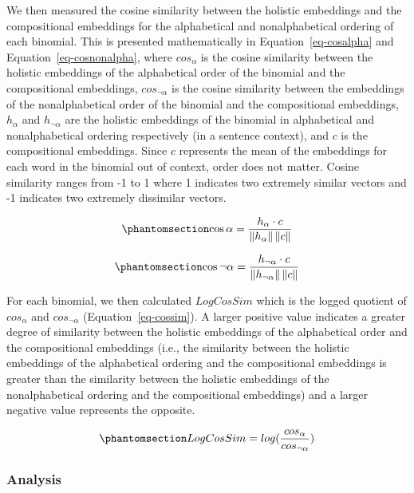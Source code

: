 \documentclass[
  12pt,
  letterpaper,
]{scrreprt}
\begin{document}
We then measured the cosine similarity between the holistic embeddings
and the compositional embeddings for the alphabetical and
nonalphabetical ordering of each binomial. This is presented
mathematically in Equation~\ref{eq-cosalpha} and
Equation~\ref{eq-cosnonalpha}, where \(cos_\alpha\) is the cosine
similarity between the holistic embeddings of the alphabetical order of
the binomial and the compositional embeddings, \(cos_{\neg\alpha}\) is
the cosine similarity between the embeddings of the nonalphabetical
order of the binomial and the compositional embeddings, \(h_\alpha\) and
\(h_{\neg\alpha}\) are the holistic embeddings of the binomial in
alphabetical and nonalphabetical ordering respectively (in a sentence
context), and \(c\) is the compositional embeddings. Since \(c\)
represents the mean of the embeddings for each word in the binomial out
of context, order does not matter. Cosine similarity ranges from -1 to 1
where 1 indicates two extremely similar vectors and -1 indicates two
extremely dissimilar vectors.

\begin{equation}\phantomsection\label{eq-cosalpha}{
\cos \alpha = \frac{h_\alpha \cdot c}{\left\lVert h_\alpha \right\rVert \left\lVert c \right\rVert}
}\end{equation}

\begin{equation}\phantomsection\label{eq-cosnonalpha}{
\cos \neg\alpha = \frac{h_{\neg\alpha} \cdot c}{\left\lVert h_{\neg\alpha}\right\rVert \left\lVert c \right\rVert}
}\end{equation}

For each binomial, we then calculated \(LogCosSim\) which is the logged
quotient of \(cos_\alpha\) and \(cos_{\neg\alpha}\)
(Equation~\ref{eq-cossim}). A larger positive value indicates a greater
degree of similarity between the holistic embeddings of the alphabetical
order and the compositional embeddings (i.e., the similarity between the
holistic embeddings of the alphabetical ordering and the compositional
embeddings is greater than the similarity between the holistic
embeddings of the nonalphabetical ordering and the compositional
embeddings) and a larger negative value represents the opposite.

\begin{equation}\phantomsection\label{eq-cossim}{
LogCosSim = log(\frac{cos_\alpha}{cos_{\neg\alpha}})
}\end{equation}

\subsubsection{Analysis}\label{analysis-4}
\end{document}

